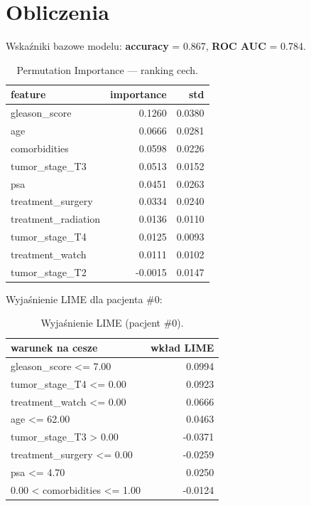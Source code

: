 \documentclass[12pt,a4paper]{article}
\begin{document}
\section{Obliczenia}
Wskaźniki bazowe modelu: \textbf{accuracy} = 0.867, \textbf{ROC AUC} = 0.784.

\begin{table}[H]
\centering
\begin{tabular}{lrr}
\toprule
feature & importance & std \\
\midrule
gleason\_score & 0.1260 & 0.0380 \\
age & 0.0666 & 0.0281 \\
comorbidities & 0.0598 & 0.0226 \\
tumor\_stage\_T3 & 0.0513 & 0.0152 \\
psa & 0.0451 & 0.0263 \\
treatment\_surgery & 0.0334 & 0.0240 \\
treatment\_radiation & 0.0136 & 0.0110 \\
tumor\_stage\_T4 & 0.0125 & 0.0093 \\
treatment\_watch & 0.0111 & 0.0102 \\
tumor\_stage\_T2 & -0.0015 & 0.0147 \\
\bottomrule
\end{tabular}

\caption{Permutation Importance --- ranking cech.}
\label{tab:pi}
\end{table}

Wyjaśnienie LIME dla pacjenta \#0:

\begin{table}[H]
\centering
\begin{tabular}{lr}
\toprule
warunek na cesze & wkład LIME \\
\midrule
gleason\_score <= 7.00 & 0.0994 \\
tumor\_stage\_T4 <= 0.00 & 0.0923 \\
treatment\_watch <= 0.00 & 0.0666 \\
age <= 62.00 & 0.0463 \\
tumor\_stage\_T3 > 0.00 & -0.0371 \\
treatment\_surgery <= 0.00 & -0.0259 \\
psa <= 4.70 & 0.0250 \\
0.00 < comorbidities <= 1.00 & -0.0124 \\
\bottomrule
\end{tabular}

\caption{Wyjaśnienie LIME (pacjent \#0).}
\label{tab:lime}
\end{table}
\end{document}
